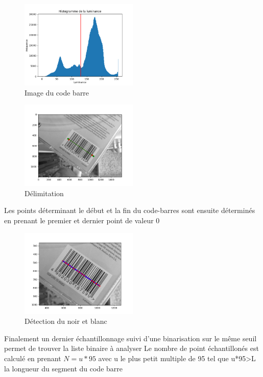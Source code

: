 \documentclass{rapport}
\begin{document}
\begin{figure}[H] 
	\centering
	\includegraphics[width=0.5\textwidth]{images/histogramme.png}
	\caption{Image du code barre}
	\label{fig:histo}
\end{figure}

\begin{figure}[H] 
	\centering
	\includegraphics[width=0.5\textwidth]{images/binarisation.png}
	\caption{Délimitation}
	\label{fig:binarisation}
\end{figure}

Les points déterminant le début et la fin du code-barres sont ensuite déterminés en prenant le premier et dernier point de valeur 0


\begin{figure}[H] 
	\centering
	\includegraphics[width=0.5\textwidth]{images/detection.png}
	\caption{Détection du noir et blanc}
	\label{fig:detection}
\end{figure}

Finalement un dernier échantillonnage suivi d'une binarisation sur le même seuil permet de trouver la liste binaire à analyser
Le nombre de point échantillonés est calculé en prenant $N=u*95$ avec u le plus petit multiple de 95 tel que u*95>L la longueur du segment du code barre
\end{document}
